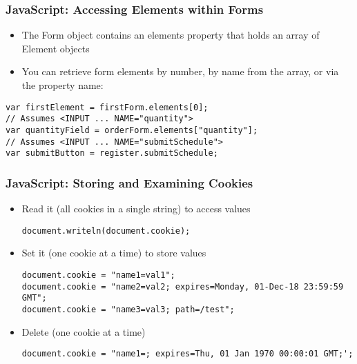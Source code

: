 \documentclass{beamer}
\begin{document}
\begin{frame}[fragile]\frametitle{JavaScript: Accessing Elements within Forms}

  \begin{itemize}
  \item The Form object contains an elements property that holds an array of Element objects
\item You can retrieve form elements by number, by name from the array, or via the property name:
  \end{itemize}

\begin{lstlisting}[style=htmlCode] 
var firstElement = firstForm.elements[0];
// Assumes <INPUT ... NAME="quantity">
var quantityField = orderForm.elements["quantity"];
// Assumes <INPUT ... NAME="submitSchedule">
var submitButton = register.submitSchedule;
\end{lstlisting}
\end{frame}

\begin{frame}[fragile]\frametitle{JavaScript: Storing and Examining Cookies}

  \begin{itemize}
\item Read it (all cookies in a single string) to access values
\begin{lstlisting}[style=htmlCode] 
document.writeln(document.cookie);
\end{lstlisting}
\item Set it (one cookie at a time) to store values
\begin{lstlisting}[style=htmlCode] 
document.cookie = "name1=val1";
document.cookie = "name2=val2; expires=Monday, 01-Dec-18 23:59:59 GMT";
document.cookie = "name3=val3; path=/test";
\end{lstlisting}
\item Delete (one cookie at a time)
\begin{lstlisting}[style=htmlCode] 
document.cookie = "name1=; expires=Thu, 01 Jan 1970 00:00:01 GMT;';  
\end{lstlisting}
\end{itemize}

\end{frame}
\end{document}
